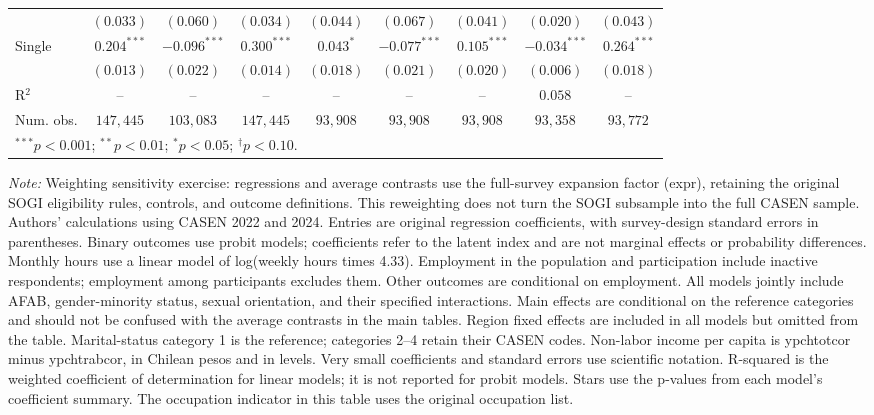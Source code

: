 \begin{table}[htpb]
{\begin{tabular}{l c c c c c c c c}
 & $(0.033)$ & $(0.060)$ & $(0.034)$ & $(0.044)$ & $(0.067)$ & $(0.041)$ & $(0.020)$ & $(0.043)$ \\
Single & $0.204^{***}$ & $-0.096^{***}$ & $0.300^{***}$ & $0.043^{*}$ & $-0.077^{***}$ & $0.105^{***}$ & $-0.034^{***}$ & $0.264^{***}$ \\
 & $(0.013)$ & $(0.022)$ & $(0.014)$ & $(0.018)$ & $(0.021)$ & $(0.020)$ & $(0.006)$ & $(0.018)$ \\
\hline
R$^2$ & -- & -- & -- & -- & -- & -- & $0.058$ & -- \\
Num. obs. & $147,445$ & $103,083$ & $147,445$ & $93,908$ & $93,908$ & $93,908$ & $93,358$ & $93,772$ \\
\hline
\multicolumn{9}{l}{\scriptsize $^{***}p<0.001$; $^{**}p<0.01$; $^{*}p<0.05$; $^{\dagger}p<0.10$.} \\
\end{tabular}%
}
\par\smallskip
\begin{minipage}{\textwidth}\footnotesize\raggedright
\textit{Note:} Weighting sensitivity exercise: regressions and average contrasts use the full-survey expansion factor (expr), retaining the original SOGI eligibility rules, controls, and outcome definitions. This reweighting does not turn the SOGI subsample into the full CASEN sample. Authors' calculations using CASEN 2022 and 2024. Entries are original regression coefficients, with survey-design standard errors in parentheses. Binary outcomes use probit models; coefficients refer to the latent index and are not marginal effects or probability differences. Monthly hours use a linear model of log(weekly hours times 4.33). Employment in the population and participation include inactive respondents; employment among participants excludes them. Other outcomes are conditional on employment. All models jointly include AFAB, gender-minority status, sexual orientation, and their specified interactions. Main effects are conditional on the reference categories and should not be confused with the average contrasts in the main tables. Region fixed effects are included in all models but omitted from the table. Marital-status category 1 is the reference; categories 2--4 retain their CASEN codes. Non-labor income per capita is ypchtotcor minus ypchtrabcor, in Chilean pesos and in levels. Very small coefficients and standard errors use scientific notation. R-squared is the weighted coefficient of determination for linear models; it is not reported for probit models. Stars use the p-values from each model's coefficient summary. The occupation indicator in this table uses the original occupation list.
\end{minipage}
\end{table}
